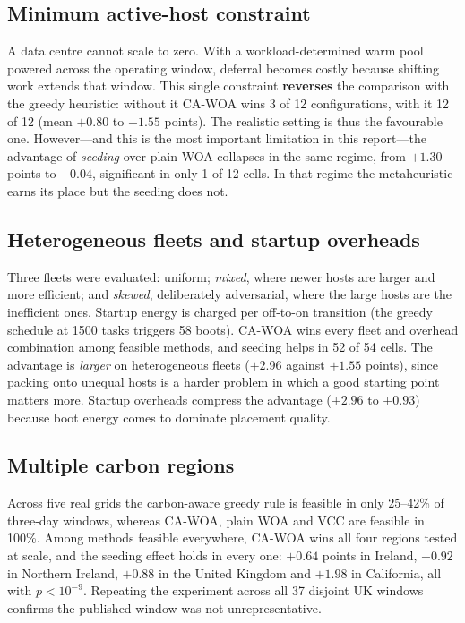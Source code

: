 \documentclass[12pt,a4paper]{article}
\providecommand{\DIFaddtex}[1]{{\protect\color{blue} \sf #1}} %
\providecommand{\DIFaddbegin}{} %
\providecommand{\DIFaddend}{} %
\providecommand{\DIFadd}[1]{\texorpdfstring{\DIFaddtex{#1}}{#1}} %
\providecommand{\DIFaddincludegraphics}[2][]{{\color{blue}\fbox{\DIFOincludegraphics[#1]{#2}}}} %
\DeclareRobustCommand{\DIFaddbegin}{\DIFOaddbegin \let\includegraphics\DIFaddincludegraphics} %
\DeclareRobustCommand{\DIFaddend}{\DIFOaddend \let\includegraphics\DIFOincludegraphics} %
\begin{document}
\subsection{\DIFadd{Minimum active-host constraint}}\label{sec:mmin}
\DIFadd{A data centre cannot scale to zero. With a workload-determined warm pool powered across the operating window,
deferral becomes costly because shifting work extends that window. This single constraint \textbf{reverses} the
comparison with the greedy heuristic: without it }\DIFaddend CA-WOA \DIFaddbegin \DIFadd{wins 3 of 12 configurations, with it 12 of 12 (mean
$+0.80$ to $+1.55$ points). The realistic setting is thus the favourable one. However---and this is the most
important limitation in this report---the advantage of \emph{seeding} over plain WOA collapses in the same
regime, from $+1.30$ points to $+0.04$, significant in only 1 of 12 cells. In that regime the metaheuristic
earns its place but the seeding does not.
}

\subsection{\DIFadd{Heterogeneous fleets and startup overheads}}\label{sec:het}
\DIFadd{Three fleets were evaluated: uniform; \emph{mixed}, where newer hosts are larger and more efficient; and
\emph{skewed}, deliberately adversarial, where the large hosts are the inefficient ones. Startup energy is
charged per off-to-on transition (the greedy schedule at 1500 tasks triggers 58 boots). CA-WOA wins every
fleet and overhead combination among feasible methods, and seeding helps in 52 of 54 cells. The advantage is
\emph{larger} on heterogeneous fleets ($+2.96$ against $+1.55$ points), since packing onto unequal hosts is a
harder problem in which a good starting point matters more. Startup overheads compress the advantage
($+2.96$ to $+0.93$) because boot energy comes to dominate placement quality.
}

\subsection{\DIFadd{Multiple carbon regions}}\label{sec:regions}
\DIFadd{Across five real grids the carbon-aware greedy rule is feasible in only 25--42\% of three-day windows, whereas
CA-WOA, plain WOA and VCC are feasible in 100\%. Among methods feasible everywhere, CA-WOA wins all four
regions tested at scale, and the seeding effect holds in every one: $+0.64$ points in Ireland, $+0.92$ in
Northern Ireland, $+0.88$ in the United Kingdom and $+1.98$ in California, all with $p<10^{-9}$. Repeating the
experiment across all 37 disjoint UK windows confirms the published window was not unrepresentative.
}
\end{document}
